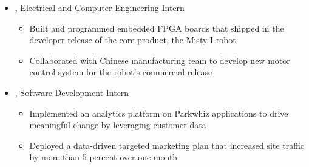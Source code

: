 \documentclass[11pt,letterpaper]{article}
\begin{document}
\begin{itemize}[label={}]
\begin{itemize}[label={}]
 \end{itemize}
 \item \small{, Electrical and Computer Engineering Intern  \hfill {}}
 \vspace{-1.58mm}
 \begin{itemize}[label={}]
    \item \small{Built and programmed embedded FPGA boards that shipped in the developer release of the core product, the Misty I robot}
 	\item \small{Collaborated with Chinese manufacturing team to develop new motor control system for the robot's commercial release}
 \end{itemize}
 \item \small{, Software Development Intern  \hfill {}}
 \vspace{-1.58mm}
 \begin{itemize}[label={}]
 	\item \small{Implemented an analytics platform on Parkwhiz applications to drive meaningful change by leveraging customer data}
 	\item \small{Deployed a data-driven targeted marketing plan that increased site traffic by more than 5 percent over one month}
 \end{itemize}

\end{itemize}
\end{document}
